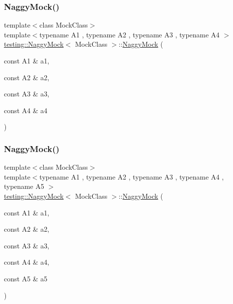 \subsubsection{\texorpdfstring{NaggyMock()}{NaggyMock()}\hspace{0.1cm}{\footnotesize\ttfamily [5/11]}}
{\footnotesize\ttfamily template$<$class Mock\+Class$>$ \\
template$<$typename A1 , typename A2 , typename A3 , typename A4 $>$ \\
\mbox{\hyperlink{classtesting_1_1NaggyMock}{testing\+::\+Naggy\+Mock}}$<$ Mock\+Class $>$\+::\mbox{\hyperlink{classtesting_1_1NaggyMock}{Naggy\+Mock}} (\begin{DoxyParamCaption}\item[{const A1 \&}]{a1,  }\item[{const A2 \&}]{a2,  }\item[{const A3 \&}]{a3,  }\item[{const A4 \&}]{a4 }\end{DoxyParamCaption})\hspace{0.3cm}{\ttfamily [inline]}}

\mbox{\label{classtesting_1_1NaggyMock_ac751c8a708935bd8558c9665160f7144}} 
\subsubsection{\texorpdfstring{NaggyMock()}{NaggyMock()}\hspace{0.1cm}{\footnotesize\ttfamily [6/11]}}
{\footnotesize\ttfamily template$<$class Mock\+Class$>$ \\
template$<$typename A1 , typename A2 , typename A3 , typename A4 , typename A5 $>$ \\
\mbox{\hyperlink{classtesting_1_1NaggyMock}{testing\+::\+Naggy\+Mock}}$<$ Mock\+Class $>$\+::\mbox{\hyperlink{classtesting_1_1NaggyMock}{Naggy\+Mock}} (\begin{DoxyParamCaption}\item[{const A1 \&}]{a1,  }\item[{const A2 \&}]{a2,  }\item[{const A3 \&}]{a3,  }\item[{const A4 \&}]{a4,  }\item[{const A5 \&}]{a5 }\end{DoxyParamCaption})\hspace{0.3cm}{\ttfamily [inline]}}

